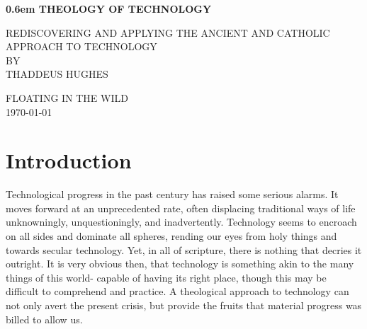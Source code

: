\documentclass[letterpaper]{article}
\begin{document}
\clearpage
\newcommand\nbvspace[1][3]{\vspace*{\stretch{#1}}}
\newcommand\nbstretchyspace{\spaceskip0.5em plus 0.25em minus 0.25em}
\newcommand{\nbtitlestretch}{\spaceskip0.6em}
\pagestyle{plain}
\begin{center}
  \bfseries
  \nbvspace[1]
  \Huge
  {\nbtitlestretch\huge
    THEOLOGY OF TECHNOLOGY}

  \nbvspace[1]
  \normalsize
  REDISCOVERING AND APPLYING THE ANCIENT AND CATHOLIC APPROACH TO TECHNOLOGY\\

  \nbvspace[1]
  \small BY\\
  \Large THADDEUS HUGHES\\

  \nbvspace[2]

  \nbvspace[3]
  \normalsize

  \large
  FLOATING IN THE WILD \\
  \small \MakeUppercase{\today} \\
\end{center}

\raggedbottom
\tableofcontents

\newpage


\section{Introduction}

Technological progress in the past century has raised some serious alarms. It moves forward at an unprecedented rate, often displacing traditional ways of life unknowningly, unquestioningly, and inadvertently. Technology seems to encroach on all sides and dominate all spheres, rending our eyes from holy things and towards secular technology. Yet, in all of scripture, there is nothing that decries it outright. It is very obvious then, that technology is something akin to the many things of this world- capable of having its right place, though this may be difficult to comprehend and practice. A theological approach to technology can not only avert the present crisis, but provide the fruits that material progress was billed to allow us.
\end{document}
